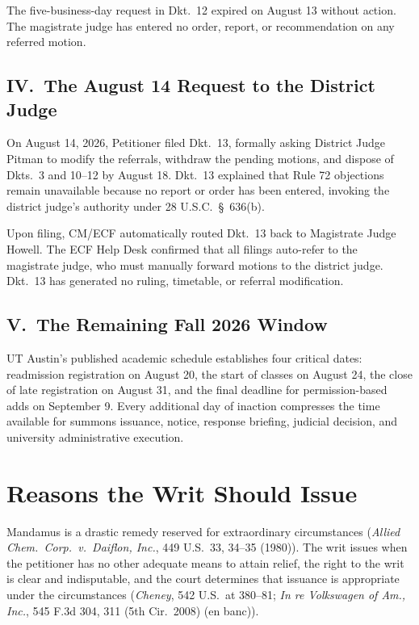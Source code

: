 \documentclass[14pt]{extarticle}
\begin{document}
The five-business-day request in Dkt.\ 12 expired on August 13 without action. The magistrate judge has entered no order, report, or recommendation on any referred motion.

\subsection*{IV.\ The August 14 Request to the District Judge}

On August 14, 2026, Petitioner filed Dkt.\ 13, formally asking District Judge Pitman to modify the referrals, withdraw the pending motions, and dispose of Dkts.\ 3 and 10--12 by August 18. Dkt.\ 13 explained that Rule 72 objections remain unavailable because no report or order has been entered, invoking the district judge's authority under 28 U.S.C.\ \S\ 636(b).

Upon filing, CM/ECF automatically routed Dkt.\ 13 back to Magistrate Judge Howell. The ECF Help Desk confirmed that all filings auto-refer to the magistrate judge, who must manually forward motions to the district judge. Dkt.\ 13 has generated no ruling, timetable, or referral modification.

\subsection*{V.\ The Remaining Fall 2026 Window}

UT Austin's published academic schedule establishes four critical dates: readmission registration on August 20, the start of classes on August 24, the close of late registration on August 31, and the final deadline for permission-based adds on September 9. Every additional day of inaction compresses the time available for summons issuance, notice, response briefing, judicial decision, and university administrative execution.

\section*{Reasons the Writ Should Issue}

Mandamus is a drastic remedy reserved for extraordinary circumstances (\textit{Allied Chem.\ Corp.\ v.\ Daiflon, Inc.}, 449 U.S.\ 33, 34--35 (1980)). The writ issues when the petitioner has no other adequate means to attain relief, the right to the writ is clear and indisputable, and the court determines that issuance is appropriate under the circumstances (\textit{Cheney}, 542 U.S.\ at 380--81; \textit{In re Volkswagen of Am., Inc.}, 545 F.3d 304, 311 (5th Cir.\ 2008) (en banc)).
\end{document}
